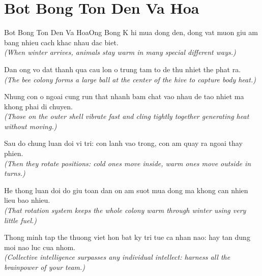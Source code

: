\section{Bot Bong Ton Den Va Hoa}
\begin{truyen}{Bot Bong Ton Den Va Hoa}{Ong Bong}
K hi mua dong den, dong vat muon giu am bang nhieu cach khac nhau dac biet.\\
\textit{(When winter arrives, animals stay warm in many special different ways.)}

Dan ong vo dat thanh qua cau lon o trung tam to de thu nhiet the phat ra.\\
\textit{(The bee colony forms a large ball at the center of the hive to capture body heat.)}

Nhung con o ngoai cung run that nhanh bam chat vao nhau de tao nhiet ma khong phai di chuyen.\\
\textit{(Those on the outer shell vibrate fast and cling tightly together generating heat without moving.)}

Sau do chung luan doi vi tri: con lanh vao trong, con am quay ra ngoai thay phien.\\
\textit{(Then they rotate positions: cold ones move inside, warm ones move outside in turns.)}

He thong luan doi do giu toan dan on am suot mua dong ma khong can nhien lieu bao nhieu.\\
\textit{(That rotation system keeps the whole colony warm through winter using very little fuel.)}

\end{truyen}
\begin{baihoc}
  Thong minh tap the thuong viet hon bat ky tri tue ca nhan nao: hay tan dung moi nao luc cua nhom.\\
  \textit{(Collective intelligence surpasses any individual intellect: harness all the brainpower of your team.)}
\end{baihoc}

